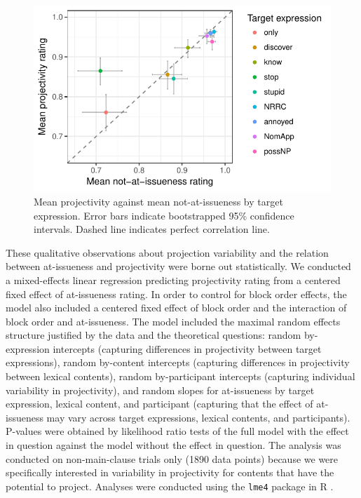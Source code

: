 \documentclass[11pt,fleqn]{article}
\newcommand{\6}{\mbox{$[\hspace*{-.6mm}[$}}
\newcommand{\9}{\mbox{$]\hspace*{-.6mm}]$}}
\begin{document}
\begin{figure}[!h]

\begin{center}
\includegraphics[width=12cm]{../results/exp1a/graphs/ai-proj-bytrigger}
\end{center}

\caption{Mean projectivity against mean not-at-issueness by target expression. Error bars indicate bootstrapped 95\% confidence intervals. Dashed line indicates perfect correlation line.}
\label{fig:f-proj-ai-1a}
\end{figure}

These qualitative observations about projection variability and the relation between at-issueness and projectivity were borne out statistically. We conducted a mixed-effects linear regression predicting projectivity rating from a centered fixed effect of at-issueness rating. In order to control for block order effects, the model also included a centered fixed effect of block order and the interaction of block order and at-issueness. The model included the maximal random effects structure justified by the data and the theoretical questions: random by-expression intercepts (capturing differences in projectivity between target expressions),  random by-content intercepts (capturing differences in projectivity between lexical contents), random by-participant intercepts (capturing individual variability in projectivity), and random slopes for at-issueness by target expression, lexical content, and participant (capturing that the effect of at-issueness may vary across target expressions, lexical contents, and participants). P-values were obtained by likelihood ratio tests of the full model with the effect in question against the model without the effect in question. The analysis was conducted on non-main-clause trials only (1890 data points) because we were specifically interested in variability in projectivity for contents that have the potential to project. Analyses were conducted using the \verb|lme4| package \citep{bates2015} in R \citep{r}.
\end{document}
